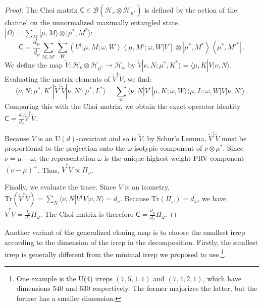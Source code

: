 \documentclass[11pt,letterpaper]{article}
\newcommand{\ket}[1]{| #1 \rangle}
\newcommand{\bra}[1]{\langle #1 |}
\newcommand{\ketbra}[2]{\left|#1\right\rangle\!\!\left\langle #2\right|}
\newcommand*{\Tr}{\mathrm{Tr}}
\begin{document}
\begin{proof}
    The Choi matrix $\mathsf{C} \in \mathcal{B}(\mathcal{H}_\nu \otimes \mathcal{H}_{\mu^*})$ is defined by the action of the channel on the unnormalized maximally entangled state $\ket{\Omega} = \sum_{M} \ket{\mu, M} \otimes \ket{\mu^*, M^*}$:
    \begin{equation}
        \mathsf{C} = \frac{d_\mu}{d_\nu} \sum_{M, M'} \sum_W \left( V^\dagger \ketbra{\mu, M; \omega, W}{\mu, M'; \omega, W} V \right) \otimes \ketbra{\mu^*, M^*}{\mu^*, M'^*} \ .
    \end{equation}
    We define the map $\tilde{V}: \mathcal{H}_\nu \otimes \mathcal{H}_{\mu^*} \to \mathcal{H}_\omega$ by $\tilde{V} \ket{\nu, N; \mu^*, K^*} = \bra{\mu, K} V \ket{\nu, N}$. Evaluating the matrix elements of $\tilde{V}^\dagger \tilde{V}$, we find:
    \begin{equation}
        \bra{\nu, N; \mu^*, K^*} \tilde{V}^\dagger \tilde{V} \ket{\nu, N'; \mu^*, L^*} = \sum_W \bra{\nu, N} V^\dagger \ket{\mu, K; \omega, W} \bra{\mu, L; \omega, W} V \ket{\nu, N'} \ .
    \end{equation}
    Comparing this with the Choi matrix, we obtain the exact operator identity $\mathsf{C} = \frac{d_\mu}{d_\nu} \tilde{V}^\dagger \tilde{V}$.
    
    Because $V$ is an U$(d)$-covariant and so is $\tilde{V}$, by Schur's Lemma, $\tilde{V}^\dagger \tilde{V}$ must be proportional to the projection onto the $\omega$ isotypic component of $\nu \otimes \mu^*$. Since $\nu = \mu + \omega$, the representation $\omega$ is the unique highest weight PRV component $(\nu-\mu)^+$. Thus, $\tilde{V}^\dagger \tilde{V} \propto \Pi_\omega$.
    
    Finally, we evaluate the trace. Since $V$ is an isometry, $\Tr(\tilde{V}^\dagger \tilde{V}) = \sum_N \bra{\nu, N} V^\dagger V \ket{\nu, N} = d_\nu$. Because $\Tr(\Pi_\omega) = d_\omega$, we have $\tilde{V}^\dagger \tilde{V} = \frac{d_\nu}{d_\omega} \Pi_\omega$. The Choi matrix is therefore $\mathsf{C} = \frac{d_\mu}{d_\omega} \Pi_\omega$.
\end{proof}


Another variant of the generalized cloning map is to choose the smallest irrep according to the dimension of the irrep in the decomposition. Firstly, the smallest irrep is generally different from the minimal irrep we proposed to use.\footnote{One example is the U(4) irreps $(7, 5, 1, 1)$ and $(7, 4, 2, 1)$, which have dimensions $540$ and $630$ respectively. The former majorizes the latter, but the former has a smaller dimension.}. 
\end{document}
